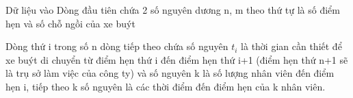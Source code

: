 Dữ liệu vào
Dòng đầu tiên chứa 2 số nguyên dương n, m theo thứ tự là số điểm hẹn và số chỗ ngồi của xe buýt  

   Dòng thứ i trong số n dòng tiếp theo chứa số nguyên $t_{i}$   là thời gian cần thiết để xe buýt di chuyển từ điểm hẹn thứ i đến điểm hẹn thứ   i+1 (điểm hẹn thứ n+1 sẽ là trụ sở làm việc của công ty) và số nguyên k là số lượng nhân viên đến điểm hẹn i, tiếp theo k số nguyên là các thời điểm đến   điểm hẹn của k nhân viên.